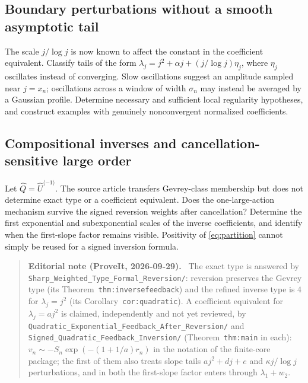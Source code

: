 \documentclass[11pt,a4paper]{article}
\theoremstyle{definition}
\newcommand{\U}{\widehat U}
\numberwithin{equation}{section}
\newenvironment{ednote}{\par\smallskip\begin{quote}\small\raggedright\textbf{Editorial note (ProveIt, 2026-09-29).}\ }{\end{quote}\smallskip}
\begin{document}
\subsection{Boundary perturbations without a smooth asymptotic tail}
The scale \(j/\log j\) is now known to affect the constant in the
coefficient equivalent. Classify tails of the form
\(\lambda_j=j^2+\alpha j+(j/\log j)\eta_j\), where \(\eta_j\)
oscillates instead of converging. Slow oscillations suggest an amplitude
sampled near \(j=x_n\); oscillations across a window of width
\(\sigma_n\) may instead be averaged by a Gaussian profile. Determine
necessary and sufficient local regularity hypotheses, and construct
examples with genuinely nonconvergent normalized coefficients.

\subsection{Compositional inverses and cancellation-sensitive large order}
Let \(\widehat Q=\U^{\langle-1\rangle}\). The source article transfers
Gevrey-class membership but does not determine exact type or a coefficient
equivalent. Does the one-large-action mechanism survive the signed
reversion weights after cancellation? Determine the first exponential and
subexponential scales of the inverse coefficients, and identify when the
first-slope factor remains visible. Positivity of \eqref{eq:partition}
cannot simply be reused for a signed inversion formula.
\begin{ednote}
The exact type is answered by
\nolinkurl{Sharp_Weighted_Type_Formal_Reversion/}: reversion preserves the
Gevrey type (its Theorem~\texttt{thm:inversefeedback}) and the refined inverse type
is $4$ for $\lambda_j=j^2$ (its Corollary~\texttt{cor:quadratic}). A coefficient
equivalent for $\lambda_j=aj^2$ is claimed, independently and not yet
reviewed, by \nolinkurl{Quadratic_Exponential_Feedback_After_Reversion/}
and \nolinkurl{Signed_Quadratic_Feedback_Inversion/} (Theorem~\texttt{thm:main} in
each): $v_n\sim-S_n\exp(-(1+1/a)r_n)$ in the notation of the finite-core
package; the first of them also treats slope tails $aj^2+dj+e$ and
$\kappa j/\log j$ perturbations, and in both the first-slope factor
enters through $\lambda_1+w_2$.
\end{ednote}
\end{document}
